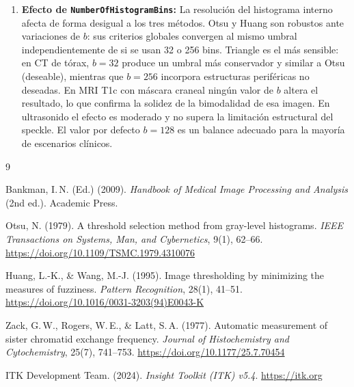 \documentclass[12pt, a4paper]{article}
\begin{document}
\begin{enumerate}
  \item \textbf{Efecto de \texttt{NumberOfHistogramBins}:} La resolución del histograma
    interno afecta de forma desigual a los tres métodos. Otsu y Huang son robustos ante
    variaciones de $b$: sus criterios globales convergen al mismo umbral independientemente
    de si se usan 32 o 256 bins. Triangle es el más sensible: en CT de tórax, $b = 32$
    produce un umbral más conservador y similar a Otsu (deseable), mientras que $b = 256$
    incorpora estructuras periféricas no deseadas. En MRI T1c con máscara craneal ningún
    valor de $b$ altera el resultado, lo que confirma la solidez de la bimodalidad de esa
    imagen. En ultrasonido el efecto es moderado y no supera la limitación estructural del
    speckle. El valor por defecto $b = 128$ es un balance adecuado para la mayoría de
    escenarios clínicos.

\end{enumerate}

\renewcommand{\refname}{Referencias}

\begin{thebibliography}{9}

  Bankman, I.\,N. (Ed.) (2009).
  \textit{Handbook of Medical Image Processing and Analysis} (2nd ed.).
  Academic Press.

  Otsu, N. (1979).
  A threshold selection method from gray-level histograms.
  \textit{IEEE Transactions on Systems, Man, and Cybernetics}, 9(1), 62--66.
  \url{https://doi.org/10.1109/TSMC.1979.4310076}

  Huang, L.-K., \& Wang, M.-J. (1995).
  Image thresholding by minimizing the measures of fuzziness.
  \textit{Pattern Recognition}, 28(1), 41--51.
  \url{https://doi.org/10.1016/0031-3203(94)E0043-K}

  Zack, G.\,W., Rogers, W.\,E., \& Latt, S.\,A. (1977).
  Automatic measurement of sister chromatid exchange frequency.
  \textit{Journal of Histochemistry and Cytochemistry}, 25(7), 741--753.
  \url{https://doi.org/10.1177/25.7.70454}

  ITK Development Team. (2024).
  \textit{Insight Toolkit (ITK) v5.4}.
  \url{https://itk.org}

\end{thebibliography}
\end{document}
